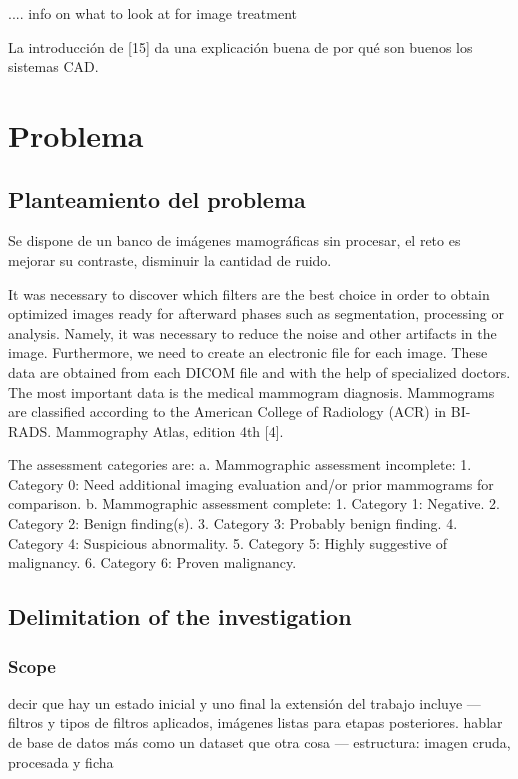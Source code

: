.... info on what to look at for image treatment 

La introducción de [15] da una explicación buena de por qué son buenos los
sistemas CAD.

\section{Problema}
\subsection{Planteamiento del problema}

Se dispone de un banco de imágenes mamográficas sin procesar, el reto es mejorar
su contraste, disminuir la cantidad de ruido.

It was necessary to discover which filters are the best choice in order to
obtain optimized images ready for afterward phases such as segmentation,
processing or analysis. Namely, it was necessary to reduce the noise and other
artifacts in the image. Furthermore, we need to create an electronic file for
each image. These data are obtained from each DICOM file and with the help of
specialized doctors.  The most important data is the medical mammogram
diagnosis. Mammograms are classified according to the American College of
Radiology (ACR) in BI-RADS. Mammography Atlas, edition 4th [4].

The assessment categories are:
a. Mammographic assessment incomplete:
1. Category 0: Need additional imaging evaluation and/or prior mammograms for comparison.
b. Mammographic assessment complete:
1. Category 1: Negative.
2. Category 2: Benign finding(s).
3. Category 3: Probably benign finding.
4. Category 4: Suspicious abnormality.
5. Category 5: Highly suggestive of malignancy.         
6. Category 6: Proven malignancy.

\subsection{Delimitation of the investigation}
\subsubsection{Scope}

decir que hay un estado inicial y uno final
la extensión del trabajo incluye --- filtros y tipos de filtros aplicados, imágenes listas para etapas posteriores. 
hablar de base de datos más como un dataset que otra cosa --- estructura: imagen cruda, procesada y ficha

